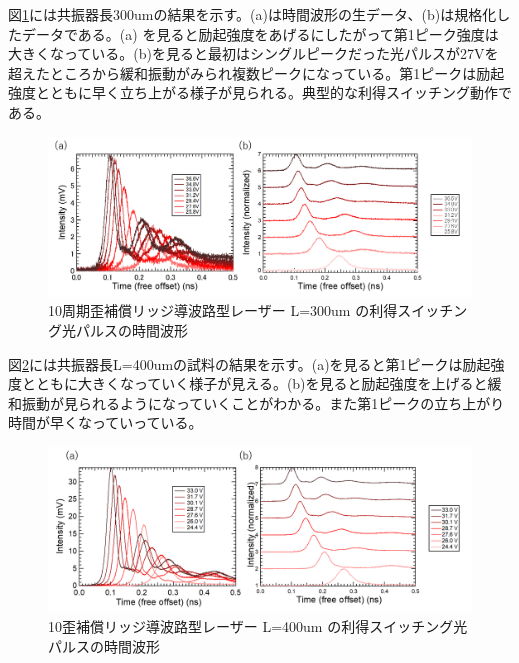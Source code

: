 {図\ref{fig:fig_3_2_10QW_ridge_L300_GS}には共振器長300umの結果を示す。(a)は時間波形の生データ、(b)は規格化したデータである。(a) を見ると励起強度をあげるにしたがって第1ピーク強度は大きくなっている。(b)を見ると最初はシングルピークだった光パルスが27Vを超えたところから緩和振動がみられ複数ピークになっている。第1ピークは励起強度とともに早く立ち上がる様子が見られる。典型的な利得スイッチング動作である。
\begin{figure}[h]
	\centering
	\includegraphics[width=15cm]{figure/fig_3_2_10QW_ridge_L300_GS.png}
		\caption{10周期歪補償リッジ導波路型レーザー L=300um の利得スイッチング光パルスの時間波形}
		\label{fig:fig_3_2_10QW_ridge_L300_GS}
\end{figure}


図\ref{fig:fig_3_2_10QW_ridge_L400_GS}には共振器長L=400umの試料の結果を示す。(a)を見ると第1ピークは励起強度とともに大きくなっていく様子が見える。(b)を見ると励起強度を上げると緩和振動が見られるようになっていくことがわかる。また第1ピークの立ち上がり時間が早くなっていっている。
\begin{figure}[h]
	\centering
	\includegraphics[width=15cm]{figure/fig_3_2_10QW_ridge_L400_GS.png}
		\caption{10歪補償リッジ導波路型レーザー L=400um の利得スイッチング光パルスの時間波形}
		\label{fig:fig_3_2_10QW_ridge_L400_GS}
\end{figure}

}
